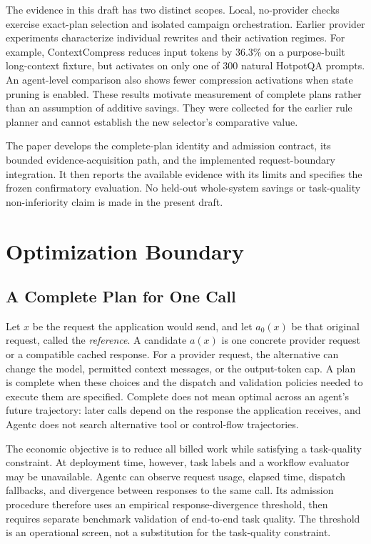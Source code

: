 The evidence in this draft has two distinct scopes. Local, no-provider checks
exercise exact-plan selection and isolated campaign orchestration. Earlier provider
experiments characterize individual rewrites and their activation regimes. For
example, ContextCompress reduces input tokens by 36.3\% on a purpose-built
long-context fixture, but activates on only one of 300 natural HotpotQA prompts.
An agent-level comparison also shows fewer compression activations when state
pruning is enabled. These results motivate measurement of complete plans rather
than an assumption of additive savings. They were collected for the earlier rule
planner and cannot establish the new selector's comparative value.

The paper develops the complete-plan identity and admission contract, its bounded
evidence-acquisition path, and the implemented request-boundary integration. It
then reports the available evidence with its limits and specifies the frozen
confirmatory evaluation. No held-out whole-system savings or task-quality
non-inferiority claim is made in the present draft.

\section{Optimization Boundary}
\label{sec:boundary}

\subsection{A Complete Plan for One Call}

Let $x$ be the request the application would send, and let $a_0(x)$ be that original
request, called the \emph{reference}. A candidate $a(x)$ is one concrete provider
request or a compatible cached response. For a provider request, the alternative
can change the model, permitted context messages, or the output-token cap. A plan
is complete when these choices and the dispatch and validation policies needed to
execute them are specified. Complete does not mean optimal across an agent's future
trajectory: later calls depend on the response the application receives, and Agentc
does not search alternative tool or control-flow trajectories.

The economic objective is to reduce all billed work while satisfying a task-quality
constraint. At deployment time, however, task labels and a workflow evaluator may
be unavailable. Agentc can observe request usage, elapsed time, dispatch fallbacks,
and divergence between responses to the same call. Its admission procedure therefore
uses an empirical response-divergence threshold, then requires separate benchmark
validation of end-to-end task quality. The threshold is an operational screen,
not a substitution for the task-quality constraint.

